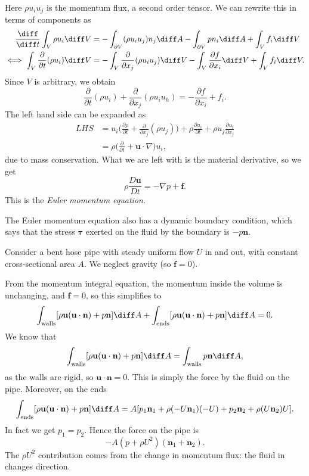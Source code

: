 \documentclass[12pt]{article}
\begin{document}
Here $\rho u_i u_j$ is the momentum flux, a second order tensor. We can rewrite this in terms of components as
\begin{align*}
	\frac{\diff}{\diff t} \int_{V} \rho u_i \diff V &= - \int_{\partial V} (\rho u_i u_j) n_j \diff A - \int_{\partial V} p n_i \diff A + \int_{V} f_i \diff V \\
	\iff \int_{V} \frac{\partial}{\partial t} (\rho u_i) \diff V &= - \int_{V} \frac{\partial}{\partial x_j} (\rho u_i u_j) \diff V - \int_{V} \frac{\partial f}{\partial x_i} \diff V + \int_{V} f_i \diff V.
\end{align*}
Since $V$ is arbitrary, we obtain
\[
\frac{\partial}{\partial t}(\rho u_i) + \frac{\partial}{\partial x_j}(\rho u_i u_h) = - \frac{\partial f}{\partial x_i} + f_i
.\]
The left hand side can be expanded as
\begin{align*}
	LHS &= u_i \biggl( \frac{\partial \rho}{\partial t} + \frac{\partial}{\partial x_j} (\rho u_j)\biggr) + \rho \frac{\partial u_i}{\partial t} + \rho u_j \frac{\partial u_i}{\partial x_j} \\
	    &= \rho \biggl(\frac{\partial}{\partial t} + \mathbf{u} \cdot \nabla\biggr) u_i,
\end{align*}
due to mass conservation. What we are left with is the material derivative, so we get
\[
\rho \frac{D \mathbf{u}}{D t} = - \nabla p + \mathbf{f}
.\]
This is the \emph{Euler momentum equation}.

The Euler momentum equation also has a dynamic boundary condition, which says that the stress $\bm{\tau}$ exerted on the fluid by the boundary is $-p \mathbf{n}$.

\begin{exbox}
	Consider a bent hose pipe with steady uniform flow $U$ in and out, with constant cross-sectional area $A$. We neglect gravity (so $\mathbf{f} = 0$).

	From the momentum integral equation, the momentum inside the volume is unchanging, and $\mathbf{f} = 0$, so this simplifies to
	\[
		\int_{\rm{walls}} [\rho \mathbf{u}(\mathbf{u} \cdot \mathbf{n}) + p \mathbf{n}] \diff A + \int_{\rm{ends}} [\rho \mathbf{u} (\mathbf{u} \cdot \mathbf{n}) + p \mathbf{n}] \diff A = 0
	.\]
	We know that
	\[
		\int_{\rm{walls}} [\rho \mathbf{u}(\mathbf{u} \cdot \mathbf{n}) + p \mathbf{n}] \diff A = \int_{\rm{walls}} p \mathbf{n} \diff A
	,\]
	as the walls are rigid, so $\mathbf{u} \cdot \mathbf{n} = 0$. This is simply the force by the fluid on the pipe. Moreover, on the ends
	\[
		\int_{\rm{ends}}[\rho \mathbf{u}(\mathbf{u} \cdot \mathbf{n}) + p \mathbf{n}] \diff A = A [p_1 \mathbf{n}_1 + \rho(-U \mathbf{n}_1)(-U) + p_2 \mathbf{n}_2 + \rho(U \mathbf{n}_2)U]
	.\]
	In fact we get $p_1 = p_2$. Hence the force on the pipe is
	\[
	-A (p + \rho U^2)(\mathbf{n}_1 + \mathbf{n}_2)
	.\]
	The $\rho U^2$ contribution comes from the change in momentum flux: the fluid in changes direction.
\end{exbox}
\end{document}
